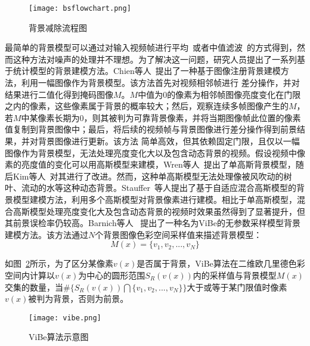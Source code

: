 \begin{figure}[htb]
  \centering%
  {\texttt{[image: bsflowchart.png]}}%
  \caption{背景减除流程图~\cite{BouwmansOverview}}
  \label{fig:2}
\end{figure}
最简单的背景模型可以通过对输入视频帧进行平均~\cite{LeeAverage}或者中值滤波~\cite{MF}的方式得到，然而这种方法对噪声的处理并不理想。为了解决这一问题，研究人员提出了一系列基于统计模型的背景建模方法。Chien等人~\cite{Chien2002Efficient}提出了一种基于图像注册背景建模方法，利用一幅图像作为背景模型。该方法首先对视频相邻帧进行
差分操作，并对结果进行二值化得到掩码图像$M$。$M$中值为0的像素为相邻帧图像亮度变化在门限之内的像素，这些像素属于背景的概率较大；然后，观察连续多帧图像产生的$M$，若$M$中某像素长期为0，则其被判为可靠背景像素，并将当期图像帧此位置的像素值复制到背景图像中；最后，将后续的视频帧与背景图像进行差分操作得到前景结果，并对背景图像进行更新。该方法
简单高效，但其依赖固定门限，且仅以一幅图像作为背景模型，无法处理亮度变化大以及包含动态背景的视频。假设视频中像素的亮度值的变化可以用高斯模型来建模，Wren等人~\cite{Wren}提出了单高斯背景模型，随后Kim等人~\cite{kim2007robust}对其进行了改进。然而，这种单高斯模型无法处理像被风吹动的树叶、流动的水等这种动态背景。Stauffer~\cite{stauffer1999adaptive}等人提出了基于自适应混合高斯模型的背景模型建模方法，利用多个高斯模型对背景像素进行建模。相比于单高斯模型，混合高斯模型处理亮度变化大及包含动态背景的视频时效果虽然得到了显著提升，但其前景误检率仍较高。Barnich等人~ \cite{Barnich2011ViBe}提出了一种名为ViBe的无参数采样模型背景建模方法。该方法通过$N$个背景图像色彩空间采样值来描述背景模型：
$$M(x)=\{v_{1},v_{2},...,v_{N}\}$$ \par
如图~\ref{fig:vibe}所示，为了区分某像素$v(x)$是否属于背景，ViBe算法在二维欧几里德色彩空间内计算以$v(x)$为中心的圆形范围$S_{R}(v(x))$内的采样值与背景模型$M(x)$交集的数量，当$\#\{S_{R}(v(x))\bigcap\{v_{1},v_{2},...,v_{N}\} \}$大于或等于某门限值时像素$v(x)$被判为背景，否则为前景。

\begin{figure}[ht]
  \centering%
  {\texttt{[image: vibe.png]}}%
  \caption{ViBe算法示意图~\cite{Barnich2011ViBe}}
  \label{fig:vibe}
\end{figure} \par


